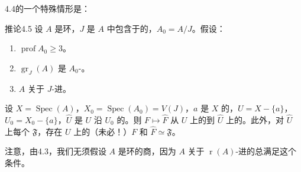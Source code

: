 4.4的一个特殊情形是：
\begin{SGAresult}{推论}{4.5}
设 $A$ 是环，$J$ 是 $A$ 中包含于的，$A_0=A/J$。假设：
\begin{enumerate}
\item[(i)] $\operatorname{prof}A_0\geq3$。
\item[(ii)] $\operatorname{gr}_J(A)$ 是 $A_0$-。
\item[(iii)] $A$ 关于 $J$-进。
\end{enumerate}
设 $X=\operatorname{Spec}(A)$，$X_0=\operatorname{Spec}(A_0)=V(J)$，$a$ 是 $X$ 的，$U=X-\{a\}$，$U_0=X_0-\{a\}$，$\widehat U$ 是 $U$ 沿 $U_0$ 的。则 $F\mapsto\widehat F$ 从 $U$ 上的到 $\widehat U$ 上的。此外，对 $\widehat U$ 上每个 $\mathfrak F$，存在 $U$ 上的（未必！）$F$ 和 $\widehat F\simeq\mathfrak F$。
\end{SGAresult}
注意，由4.3，我们无须假设 $A$ 是环的商，因为 $A$ 关于 $\operatorname r(A)$-进的总满足这个条件。

